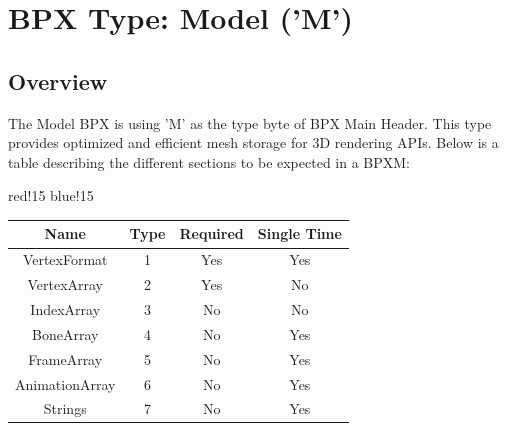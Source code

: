 \section{BPX Type: Model ('M')}

\subsection{Overview}
The Model BPX is using 'M' as the type byte of BPX Main Header. This type provides optimized and efficient mesh storage for 3D rendering APIs.
\newline
Below is a table describing the different sections to be expected in a BPXM:
\begin{center}
    {
        {red!15}
        {blue!15}
        \begin{tabular}{|c|c|c|c|}
            \hline
            \textbf{Name} & \textbf{Type} & \textbf{Required} & \textbf{Single Time} \\
    
            \hline\hline
            VertexFormat & 1 & Yes & Yes \\
            VertexArray & 2 & Yes & No \\
            IndexArray & 3 & No & No \\
            BoneArray & 4 & No & Yes \\
            FrameArray & 5 & No & Yes \\
            AnimationArray & 6 & No & Yes \\
            Strings & 7 & No & Yes \\
            \hline
        \end{tabular}
    }
\end{center}

